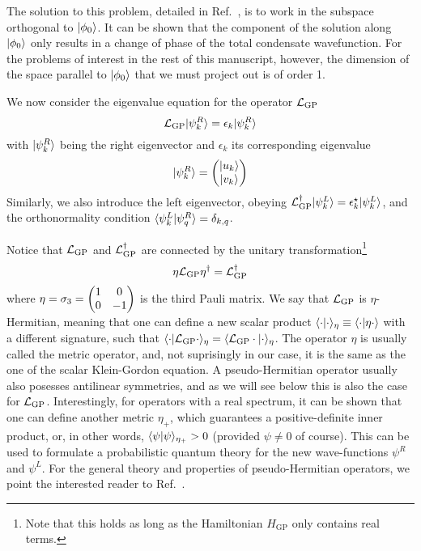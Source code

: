 The solution to this problem, detailed in Ref.~\cite{Castin_1998},
is to work in the subspace orthogonal to $\vert \phi_0 \rangle$. It can be
shown that the component of the solution along $\vert \phi_0 \rangle$ only
results in a change of phase of the total condensate wavefunction. For
the problems of interest in the rest of this manuscript, however, the
dimension of the space parallel to $\vert \phi_0 \rangle$ that we must project
out is of order 1.

We now consider the eigenvalue equation for the operator $\mathcal{L}_{\text{GP}}$
%
\begin{equation}\label{eq:L-eigen}
  \mathcal{L}_{\text{GP}} \vert \psi_k^R \rangle = \epsilon_k \vert \psi_k^R \rangle
\end{equation}
% 
with $\vert \psi_k^R \rangle$ being the right eigenvector and $\epsilon_k$ its
corresponding eigenvalue
%
\begin{equation}\label{eq:psi-R}
  \vert \psi_k^R \rangle = \begin{pmatrix} \vert u_k \rangle\\ \vert v_k \rangle \end{pmatrix}
\end{equation}
% 
Similarly, we also introduce the left eigenvector, obeying
$\mathcal{L}_{\text{GP}}^{\dagger} \vert \psi_k^L \rangle = \epsilon_k^{\star} \vert \psi_k^L \rangle$,
and the orthonormality condition
$\langle \psi_k^L \vert \psi_q^R \rangle = \delta_{k,q}$. 

Notice that $\mathcal{L}_{\text{GP}}$ and $\mathcal{L}_{\text{GP}}^{\dagger}$ are
connected by the unitary transformation\footnote{Note that this holds
  as long as the Hamiltonian $H_{\text{GP}}$ only contains real
  terms.}
%
\begin{equation}\label{eq:symmetry-1}
  \eta \mathcal{L}_{\text{GP}} \eta^{\dagger} = \mathcal{L}_{\text{GP}}^{\dagger}
\end{equation}
% 
where $\eta = \sigma_3 = \begin{pmatrix} 1 & 0\\ 0 & -1 \end{pmatrix}$ is the third Pauli
matrix. We say that $\mathcal{L}_{\text{GP}}$ is $\eta$-Hermitian, meaning
that one can define a new scalar product
$\langle \cdot \vert \cdot \rangle_{\eta} \equiv \langle \cdot \vert \eta \cdot \rangle$ with a
different signature, such that
$\langle \cdot \vert \mathcal{L}_{\text{GP}} \cdot \rangle_{\eta} =
\langle \mathcal{L}_{\text{GP}} \cdot \vert \cdot \rangle_{\eta}$. The operator $\eta$ is
usually called the metric operator, and, not suprisingly in our case,
it is the same as the one of the scalar Klein-Gordon equation. A
pseudo-Hermitian operator usually also posesses antilinear symmetries,
and as we will see below this is also the case for
$\mathcal{L}_{\text{GP}}$. Interestingly, for operators with a real spectrum,
it can be shown that one can define another metric $\eta_+$, which
guarantees a positive-definite inner product, or, in other words,
$\langle \psi \vert \psi \rangle_{\eta_+} > 0$ (provided $\psi \neq 0$ of
course). This can be used to formulate a probabilistic quantum theory
for the new wave-functions $\psi^R$ and $\psi^L$. For the general
theory and properties of pseudo-Hermitian operators, we point the
interested reader to Ref.~\cite{MOSTAFAZADEH_2010}.


